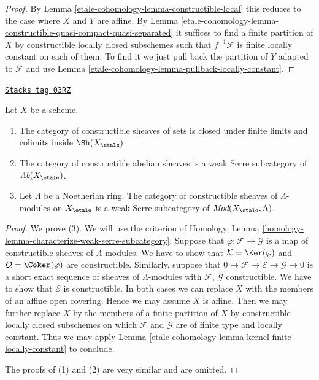 \begin{proof}
By Lemma \ref{etale-cohomology-lemma-constructible-local} this reduces to the case
where $X$ and $Y$ are affine. By
Lemma \ref{etale-cohomology-lemma-constructible-quasi-compact-quasi-separated}
it suffices to find a finite partition of $X$ by constructible
locally closed subschemes such that $f^{-1}\mathcal{F}$ is finite locally
constant on each of them.
To find it we just pull back the partition of $Y$ adapted to
$\mathcal{F}$ and use
Lemma \ref{etale-cohomology-lemma-pullback-locally-constant}.
\end{proof}

\begin{lemma}
\label{etale-cohomology-lemma-constructible-abelian}
\href{https://stacks.math.columbia.edu/tag/03RZ}{\texttt{Stacks tag 03RZ}}

Let $X$ be a scheme.
\begin{enumerate}
\item The category of constructible sheaves of sets
is closed under finite limits and colimits inside $\Sh(X_\etale)$.
\item The category of constructible abelian sheaves is a
weak Serre subcategory of $\textit{Ab}(X_\etale)$.
\item Let $\Lambda$ be a Noetherian ring. The category of
constructible sheaves of $\Lambda$-modules on
$X_\etale$ is a weak Serre subcategory of
$\textit{Mod}(X_\etale, \Lambda)$.
\end{enumerate}
\end{lemma}

\begin{proof}
We prove (3). We will use the criterion of
Homology, Lemma \ref{homology-lemma-characterize-weak-serre-subcategory}.
Suppose that $\varphi : \mathcal{F} \to \mathcal{G}$
is a map of constructible sheaves of $\Lambda$-modules.
We have to show that $\mathcal{K} = \Ker(\varphi)$ and
$\mathcal{Q} = \Coker(\varphi)$ are constructible.
Similarly, suppose that
$0 \to \mathcal{F} \to \mathcal{E} \to \mathcal{G} \to 0$
is a short exact sequence of sheaves of $\Lambda$-modules
with $\mathcal{F}$, $\mathcal{G}$ constructible. We have to show
that $\mathcal{E}$ is constructible.
In both cases we can replace $X$ with the members of an
affine open covering. Hence we may assume $X$ is affine.
Then we may further replace $X$ by the members of a finite
partition of $X$ by constructible locally closed subschemes
on which $\mathcal{F}$ and $\mathcal{G}$ are of finite type and
locally constant. Thus we may apply
Lemma \ref{etale-cohomology-lemma-kernel-finite-locally-constant} to conclude.

\medskip\noindent
The proofs of (1) and (2) are very similar and are omitted.
\end{proof}

